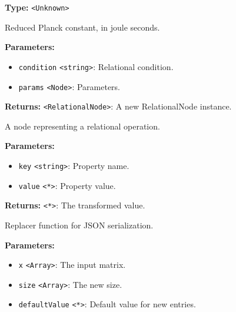 \documentclass[12pt,a4paper]{article}
\begin{document}
\noindent \textbf{Type:} \texttt{<Unknown>}

\noindent Reduced Planck constant, in joule seconds.

\vspace{5mm}
\noindent {}


\noindent \textbf{Parameters:}
\begin{itemize}
  \item \texttt{condition} \texttt{<string>}: Relational condition.
  \item \texttt{params} \texttt{<Node>}: Parameters.
\end{itemize}

\noindent \textbf{Returns:} \texttt{<RelationalNode>}: A new RelationalNode instance.

\noindent A node representing a relational operation.

\vspace{5mm}
\noindent {}


\noindent \textbf{Parameters:}
\begin{itemize}
  \item \texttt{key} \texttt{<string>}: Property name.
  \item \texttt{value} \texttt{<*>}: Property value.
\end{itemize}

\noindent \textbf{Returns:} \texttt{<*>}: The transformed value.

\noindent Replacer function for JSON serialization.

\vspace{5mm}
\noindent {}


\noindent \textbf{Parameters:}
\begin{itemize}
  \item \texttt{x} \texttt{<Array>}: The input matrix.
  \item \texttt{size} \texttt{<Array>}: The new size.
  \item \texttt{defaultValue} \texttt{<*>}: Default value for new entries.
\end{itemize}
\end{document}
